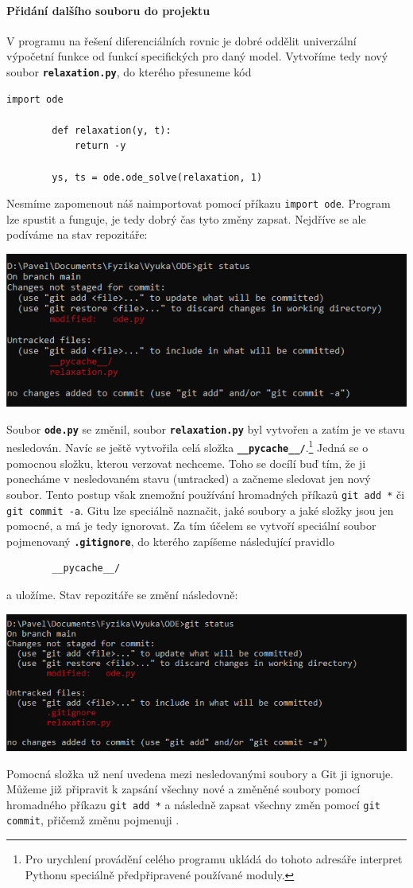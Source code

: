 \documentclass[a4paper,11pt,twoside]{article}
\newcommand{\subsubsubsection}[1]{\paragraph{#1}\mbox{}

}
\def\code#1{\textnormal{\texttt{#1}}}
\def\file#1{\textnormal{\textbf{\texttt{#1}}}}
\theoremstyle{red}
\theoremstyle{green}
\begin{document}
\subsubsubsection{Přidání dalšího souboru do projektu}
    V programu na řešení diferenciálních rovnic je dobré oddělit univerzální výpočetní funkce od funkcí specifických pro daný model.
    Vytvoříme tedy nový soubor \file{relaxation.py}, do kterého přesuneme kód
    \begin{lstlisting}[style=TinyPython]
        import ode

        def relaxation(y, t):
            return -y
        
        ys, ts = ode.ode_solve(relaxation, 1)\end{lstlisting}
    Nesmíme zapomenout náš  naimportovat pomocí příkazu \code{import ode}.
    Program lze spustit a funguje, je tedy dobrý čas tyto změny zapsat.
    Nejdříve se ale podíváme na stav repozitáře:    
    \begin{center}\includegraphics[width=0.7\linewidth]{GitStatusChange2.png}\end{center}
    Soubor \file{ode.py} se změnil, soubor \file{relaxation.py} byl vytvořen a zatím je ve stavu nesledován.
    Navíc se ještě vytvořila celá složka \file{\_\_pycache\_\_/}.\footnote{
        Pro urychlení provádění celého programu ukládá do tohoto adresáře interpret Pythonu speciálně předpřipravené používané moduly.
    }
    Jedná se o pomocnou složku, kterou verzovat nechceme.
    Toho se docílí buď tím, že ji ponecháme v nesledovaném stavu (untracked) a začneme sledovat jen nový soubor.
    Tento postup však znemožní používání hromadných příkazů \code{git add *} či \code{git commit -a}.
    Gitu lze speciálně naznačit, jaké soubory a jaké složky jsou jen pomocné, a má je tedy ignorovat.
    Za tím účelem se vytvoří speciální soubor pojmenovaný \file{.gitignore}, do kterého zapíšeme následující pravidlo
    \begin{lstlisting}
        __pycache__/\end{lstlisting}
    a uložíme.
    Stav repozitáře se změní následovně:
    \begin{center}\includegraphics[width=0.7\linewidth]{GitStatusIgnore.png}\end{center}
    Pomocná složka už není uvedena mezi nesledovanými soubory a Git ji ignoruje.
    Můžeme již připravit k zapsání všechny nové a změněné soubory pomocí hromadného příkazu \code{git add *} a následně zapsat všechny změn pomocí \code{git commit},
    přičemž změnu pojmenuji .
\end{document}
